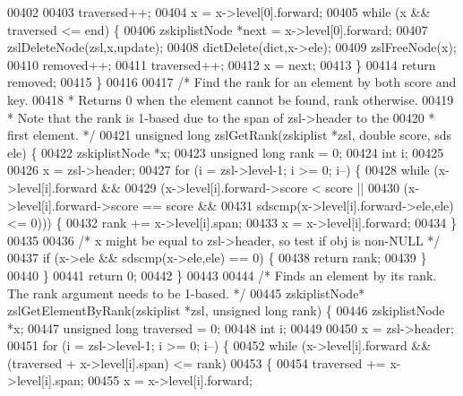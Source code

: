 \begin{DoxyCode}
00402 
00403     traversed++;
00404     x = x->level[0].forward;
00405     \textcolor{keywordflow}{while} (x && traversed <= end) \{
00406         zskiplistNode *next = x->level[0].forward;
00407         zslDeleteNode(zsl,x,update);
00408         dictDelete(dict,x->ele);
00409         zslFreeNode(x);
00410         removed++;
00411         traversed++;
00412         x = next;
00413     \}
00414     \textcolor{keywordflow}{return} removed;
00415 \}
00416 
00417 \textcolor{comment}{/* Find the rank for an element by both score and key.}
00418 \textcolor{comment}{ * Returns 0 when the element cannot be found, rank otherwise.}
00419 \textcolor{comment}{ * Note that the rank is 1-based due to the span of zsl->header to the}
00420 \textcolor{comment}{ * first element. */}
00421 \textcolor{keywordtype}{unsigned} \textcolor{keywordtype}{long} zslGetRank(zskiplist *zsl, \textcolor{keywordtype}{double} score, sds ele) \{
00422     zskiplistNode *x;
00423     \textcolor{keywordtype}{unsigned} \textcolor{keywordtype}{long} rank = 0;
00424     \textcolor{keywordtype}{int} i;
00425 
00426     x = zsl->header;
00427     \textcolor{keywordflow}{for} (i = zsl->level-1; i >= 0; i--) \{
00428         \textcolor{keywordflow}{while} (x->level[i].forward &&
00429             (x->level[i].forward->score < score ||
00430                 (x->level[i].forward->score == score &&
00431                 sdscmp(x->level[i].forward->ele,ele) <= 0))) \{
00432             rank += x->level[i].span;
00433             x = x->level[i].forward;
00434         \}
00435 
00436         \textcolor{comment}{/* x might be equal to zsl->header, so test if obj is non-NULL */}
00437         \textcolor{keywordflow}{if} (x->ele && sdscmp(x->ele,ele) == 0) \{
00438             \textcolor{keywordflow}{return} rank;
00439         \}
00440     \}
00441     \textcolor{keywordflow}{return} 0;
00442 \}
00443 
00444 \textcolor{comment}{/* Finds an element by its rank. The rank argument needs to be 1-based. */}
00445 zskiplistNode* zslGetElementByRank(zskiplist *zsl, \textcolor{keywordtype}{unsigned} \textcolor{keywordtype}{long} rank) \{
00446     zskiplistNode *x;
00447     \textcolor{keywordtype}{unsigned} \textcolor{keywordtype}{long} traversed = 0;
00448     \textcolor{keywordtype}{int} i;
00449 
00450     x = zsl->header;
00451     \textcolor{keywordflow}{for} (i = zsl->level-1; i >= 0; i--) \{
00452         \textcolor{keywordflow}{while} (x->level[i].forward && (traversed + x->level[i].span) <= rank)
00453         \{
00454             traversed += x->level[i].span;
00455             x = x->level[i].forward;

\end{DoxyCode}
